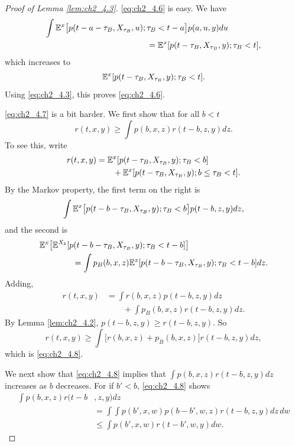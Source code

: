 \begin{proof}[Proof of Lemma \ref{lem:ch2_4.3}]
\eqref{eq:ch2_4.6} is easy. We have
\begin{align*}
    \int \mathbb{E}^x\big[p(t-a-\tau_B,X_{\tau_B},u);\,&\tau_B < t-a\big]p(a,u,y)du \\
    &= \mathbb{E}^x[p(t-\tau_B,X_{\tau_B},y);\tau_B < t],
\end{align*}
which increases to
\[
    \mathbb{E}^x[p(t-\tau_B,X_{\tau_B},y);\tau_B < t].
\]
Using \eqref{eq:ch2_4.3}, this proves \eqref{eq:ch2_4.6}.

\eqref{eq:ch2_4.7} is a bit harder. We first show that for all $b < t$
\begin{equation}\label{eq:ch2_4.8}
    r(t,x,y) \geq \int p(b,x,z)r(t-b,z,y)dz.
\end{equation}
To see this, write
\begin{align*}
    r(t,x,y) &= \mathbb{E}^x[p(t-\tau_B,X_{\tau_B},y);\tau_B < b] \\
    &\qquad+ \mathbb{E}^x[p(t-\tau_B,X_{\tau_B},y);b \leq \tau_B < t].
\end{align*}
By the Markov property, the first term on the right is
\[
    \int \mathbb{E}^x\big[p(t-b-\tau_B,X_{\tau_B},y);\tau_B < b\big]p(t-b,z,y)dz,
\]
and the second is
\begin{align*}
    &\mathbb{E}^x\big[\mathbb{E}^{X_b}[p(t-b-\tau_B,X_{\tau_B},y);\tau_B<t-b]\big] \\
    &\qquad\qquad= \int p_B(b,x,z)\mathbb{E}^z[p(t-b-\tau_B,X_{\tau_B},y);\tau_B < t-b]dz.
\end{align*}
Adding,
\begin{align*}
    r(t,x,y) &= \int r(b,x,z)p(t-b,z,y)dz \\
    &\qquad+ \int p_B(b,x,z)r(t-b,z,y)dz.
\end{align*}
By Lemma \ref{lem:ch2_4.2}, $p(t-b,z,y) \geq r(t-b,z,y)$. So
\[
    r(t,x,y) \geq \int\big[r(b,x,z) + p_B(b,x,z)\big]r(t-b,z,y)dz,
\]
which is \eqref{eq:ch2_4.8}.

We next show that \eqref{eq:ch2_4.8} implies that $\int p(b,x,z)r(t-b,z,y)dz$ increases as $b$ decreases. For if $b' < b$, \eqref{eq:ch2_4.8} shows
\mpagebreak
\begin{align*}
    \int p(b, x, z)r(t - b&, z, y)dz \\
    &= \int \int p(b', x, w)p(b - b', w, z)r(t - b, z, y)dz\,dw \\
    &\leq \int p(b', x, w)r(t - b', w, y)dw.
\end{align*}



\end{proof}
